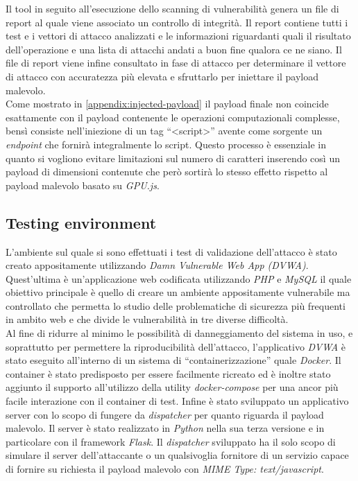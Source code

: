 \documentclass[conference, italian]{IEEEtran}
\begin{document}
Il tool in seguito all'esecuzione dello scanning di vulnerabilità genera un file di report al quale viene associato un controllo di integrità. Il report contiene tutti i test e i vettori di attacco analizzati e le informazioni riguardanti quali il risultato dell'operazione e una lista di attacchi andati a buon fine qualora ce ne siano. Il file di report viene infine consultato in fase di attacco per determinare il vettore di attacco con accuratezza più elevata e sfruttarlo per iniettare il payload malevolo.\\
Come mostrato in \cref{appendix:injected-payload} il payload finale non coincide esattamente con il payload contenente le operazioni computazionali complesse, bensì consiste nell'iniezione di un tag ``<script>'' avente come sorgente un \emph{endpoint} che fornirà integralmente lo script. Questo processo è essenziale in quanto si vogliono evitare limitazioni sul numero di caratteri inserendo così un payload di dimensioni contenute che però sortirà lo stesso effetto rispetto al payload malevolo basato su \emph{GPU.js}.

\subsection{Testing environment}\label{sec:testing-environment}
L'ambiente sul quale si sono effettuati i test di validazione dell'attacco è stato creato appositamente utilizzando \emph{Damn Vulnerable Web App (DVWA)}\cite{DVWA}. Quest'ultima è un'applicazione web codificata utilizzando \emph{PHP} e \emph{MySQL} il quale obiettivo principale è quello di creare un ambiente appositamente vulnerabile ma controllato che permetta lo studio delle problematiche di sicurezza più frequenti in ambito web e che divide le vulnerabilità in tre diverse difficoltà.\\
Al fine di ridurre al minimo le possibilità di danneggiamento del sistema in uso, e soprattutto per permettere la riproducibilità dell'attacco, l'applicativo \emph{DVWA} è stato eseguito all'interno di un sistema di ``containerizzazione'' quale \emph{Docker}\cite{merkel2014docker}. Il container è stato predisposto per essere facilmente ricreato ed è inoltre stato aggiunto il supporto all'utilizzo della utility \emph{docker-compose} per una ancor più facile interazione con il container di test.
Infine è stato sviluppato un applicativo server con lo scopo di fungere da \emph{dispatcher} per quanto riguarda il payload malevolo. Il server è stato realizzato in \emph{Python} nella sua terza versione\cite{python3} e in particolare con il framework \emph{Flask}\cite{grinberg2018flask}. Il \emph{dispatcher} sviluppato ha il solo scopo di simulare il server dell'attaccante o un qualsivoglia fornitore di un servizio capace di fornire su richiesta il payload malevolo con \emph{MIME Type: text/javascript}\cite{MIMEType}.
\end{document}
